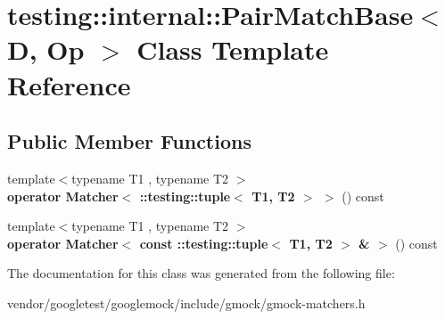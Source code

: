 \hypertarget{classtesting_1_1internal_1_1_pair_match_base}{}\section{testing\+:\+:internal\+:\+:Pair\+Match\+Base$<$ D, Op $>$ Class Template Reference}
\label{classtesting_1_1internal_1_1_pair_match_base}
\subsection*{Public Member Functions}
\begin{DoxyCompactItemize}
\item 
\mbox{\label{classtesting_1_1internal_1_1_pair_match_base_ae73a3764537d725ce10e9e806ebdb417}} 
{\footnotesize template$<$typename T1 , typename T2 $>$ }\\{\bfseries operator Matcher$<$ \+::testing\+::tuple$<$ T1, T2 $>$ $>$} () const
\item 
\mbox{\label{classtesting_1_1internal_1_1_pair_match_base_a0482f7e530420faecf00b9fca059b694}} 
{\footnotesize template$<$typename T1 , typename T2 $>$ }\\{\bfseries operator Matcher$<$ const \+::testing\+::tuple$<$ T1, T2 $>$ \& $>$} () const
\end{DoxyCompactItemize}


The documentation for this class was generated from the following file\+:\begin{DoxyCompactItemize}
\item 
vendor/googletest/googlemock/include/gmock/gmock-\/matchers.\+h\end{DoxyCompactItemize}
